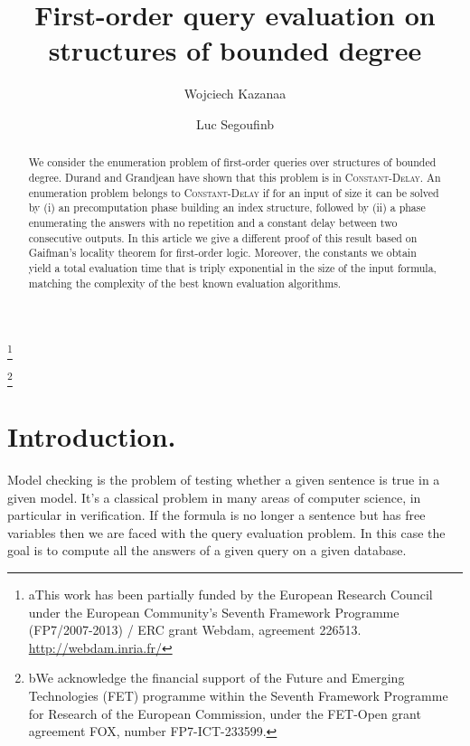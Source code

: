 \documentclass{LMCS}
\newcommand{\CDlin}{{\textsc{Constant-}\textsc{Delay}}\xspace}
\begin{document}
\title[First-order query evaluation on structures of bounded degree]{First-order query evaluation on structures of bounded degree}

\author[W.~Kazana]{Wojciech Kazana\rsuper a}	\address{{\lsuper a}INRIA and ENS Cachan}	  \thanks{{\lsuper a}This work has been partially funded by the European
  Research Council under the European Community's Seventh Framework
  Programme (FP7/2007-2013) / ERC grant Webdam, agreement
  226513. \url{http://webdam.inria.fr/}}	

\author[L.~Segoufin]{Luc Segoufin\rsuper b} \address{{\lsuper b}INRIA and ENS Cachan}  \thanks{{\lsuper b}We acknowledge the financial support of the Future 
  and Emerging Technologies (FET) programme within the Seventh
  Framework Programme for Research of the European Commission, under
  the FET-Open grant agreement FOX, number FP7-ICT-233599.} 


\begin{abstract}
  We consider the enumeration problem of first-order queries over
  structures of bounded degree. Durand and Grandjean have shown that
  this problem is in \CDlin. An enumeration problem belongs to \CDlin if
  for an input of size  it can be solved by (i) an  precomputation
  phase building an index structure, followed by (ii) a phase enumerating
  the answers with no repetition and a constant delay between two
  consecutive outputs.
  In this article we give a different proof of this result based on
  Gaifman's locality theorem for first-order logic. Moreover, the
  constants we obtain yield a total evaluation time that is triply
  exponential in the size of the input formula, matching the
  complexity of the best known evaluation algorithms.
\end{abstract}

\maketitle

\section{Introduction.}

Model checking is the problem of testing whether a given sentence is true in a
given model. It's a classical problem in many areas of computer science, in
particular in verification.  If the formula is no longer a sentence but has
free variables then we are faced with the query evaluation problem. In this
case the goal is to compute all the answers of a given query on a given
database.
\end{document}

